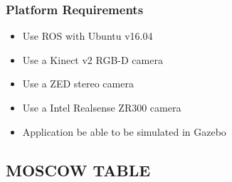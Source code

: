 \documentclass{mproj}
\begin{document}
\subsubsection{Platform Requirements}
\begin{itemize}
\item Use ROS with Ubuntu v16.04
\item Use a Kinect v2 RGB-D camera
\item Use a ZED stereo camera
\item Use a Intel Realsense ZR300 camera
\item Application be able to be simulated in Gazebo
\end{itemize}

 \subsection{MOSCOW TABLE}
\end{document}

